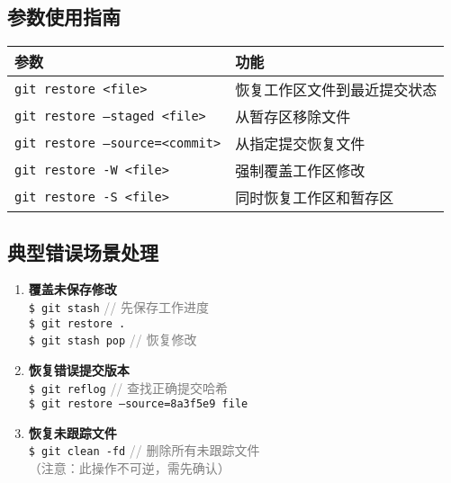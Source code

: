 \subsection{参数使用指南}
\begin{center}
\begin{tabular}{@{}ll@{}}
    \toprule
    \textbf{参数} & \textbf{功能} \\
    \midrule
    \texttt{git restore <file>} & 恢复工作区文件到最近提交状态 \\
    \texttt{git restore --staged <file>} & 从暂存区移除文件 \\
    \texttt{git restore --source=<commit>} & 从指定提交恢复文件 \\
    \texttt{git restore -W <file>} & 强制覆盖工作区修改 \\
    \texttt{git restore -S <file>} & 同时恢复工作区和暂存区 \\
    \bottomrule
\end{tabular}
\end{center}

\subsection{典型错误场景处理}
\begin{enumerate}[leftmargin=*, nosep]
    \item \textbf{覆盖未保存修改} \\
    \texttt{\$ git stash} \quad \textcolor{gray}{// 先保存工作进度} \\
    \texttt{\$ git restore .} \\
    \texttt{\$ git stash pop} \quad \textcolor{gray}{// 恢复修改}
    
    \item \textbf{恢复错误提交版本} \\
    \texttt{\$ git reflog} \quad \textcolor{gray}{// 查找正确提交哈希} \\
    \texttt{\$ git restore --source=8a3f5e9 file}
     
    \item \textbf{恢复未跟踪文件} \\
    \texttt{\$ git clean -fd} \quad \textcolor{gray}{// 删除所有未跟踪文件} \\
    \textcolor{gray}{（注意：此操作不可逆，需先确认）}
\end{enumerate}

